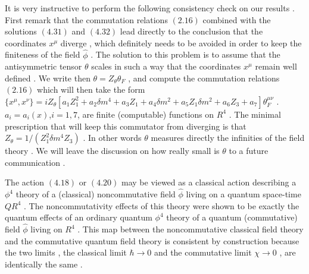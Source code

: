 \documentclass[a4paper,12pt]{article}
\begin{document}
It is very instructive to perform the following consistency check on our results . First remark that the commutation relations $(2.16)$ combined with the solutions $(4.31)$ and $(4.32)$ lead directly to the conclusion that the coordinates $x^{\mu}$ diverge , which definitely needs to be avoided in order to keep the finiteness of the field $\hat{\phi}$ . The solution to this problem is to assume that the antisymmetric tensor ${\theta}$ scales in such a way that the coordinates $x^{\mu}$ remain well defined . We write then ${\theta}=Z_{\theta}{\theta}_F$ , and compute the commutation relations $(2.16)$ which will then take the form $\{x^{\mu},x^{\nu}\}=iZ_{\theta}[a_1 Z_1^2 + a_2 {\delta}m^4 + a_3 Z_1 + a_4 {\delta}m^2 + a_5 Z_1{\delta}m^2 + a_6 Z_3 +a_7 ]{\theta}_F^{{\mu}{\nu}}$ . $a_i=a_i(x)$,$i=1,7$, are finite (computable) functions on $R^4$ . The minimal prescription that will keep this commutator from diverging is that $Z_{\theta}=1/({Z_1^2{\delta}m^4Z_3})$ . In other words ${\theta}$ measures directly the infinities of the field theory . We will leave the discussion on how really small is ${\theta}$ to a future communication .


The action $(4.18)$ or $(4.20)$ may be viewed as a classical action describing a ${\phi}^4$ theory of a (classical) noncommutative field ${\hat{\phi}}$ living on a quantum space-time $QR^4$ . The noncommutativity effects of this theory were shown to be exactly the quantum effects of an ordinary quantum ${\phi}^4$ theory of a quantum (commutative) field ${\hat{\phi}}$ living on $R^4$ . This map between the noncommutative classical field theory and the commutative quantum field theory is consistent by construction because the two limits , the classical limit ${\hbar}{\longrightarrow}0$ and the commutative limit ${\chi}{\longrightarrow}0$ , are identically the same . 
\end{document}
